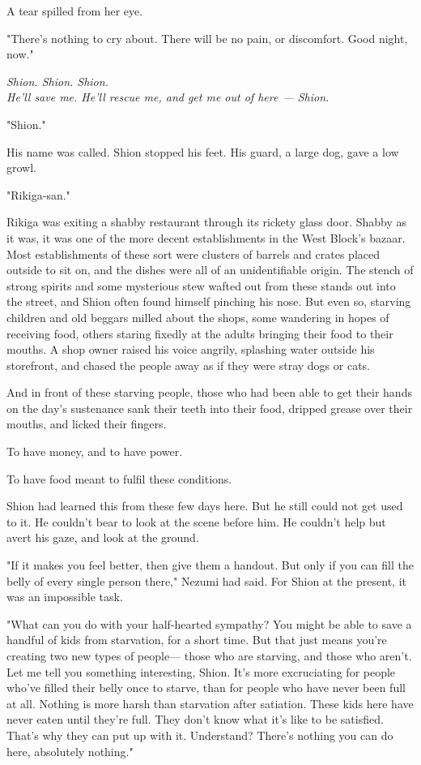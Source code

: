 A tear spilled from her eye.

"There's nothing to cry about. There will be no pain, or discomfort.
Good night, now."

\myspace

\emph{Shion. Shion. Shion.\\
	He'll save me. He'll rescue me, and get me out of here --- Shion.}

\myspace

"Shion."

His name was called. Shion stopped his feet. His guard, a large dog,
gave a low growl.

"Rikiga-san."

Rikiga was exiting a shabby restaurant through its rickety glass door.
Shabby as it was, it was one of the more decent establishments in the
West Block's bazaar. Most establishments of these sort were clusters of
barrels and crates placed outside to sit on, and the dishes were all of
an unidentifiable origin. The stench of strong spirits and some
mysterious stew wafted out from these stands out into the street, and
Shion often found himself pinching his nose. But even so, starving
children and old beggars milled about the shops, some wandering in hopes
of receiving food, others staring fixedly at the adults bringing their
food to their mouths. A shop owner raised his voice angrily, splashing
water outside his storefront, and chased the people away as if they were
stray dogs or cats.

And in front of these starving people, those who had been able to get
their hands on the day's sustenance sank their teeth into their food,
dripped grease over their mouths, and licked their fingers.

To have money, and to have power.

To have food meant to fulfil these conditions.

Shion had learned this from these few days here. But he still could not
get used to it. He couldn't bear to look at the scene before him. He
couldn't help but avert his gaze, and look at the ground.

"If it makes you feel better, then give them a handout. But only if you
can fill the belly of every single person there," Nezumi had said. For
Shion at the present, it was an impossible task.

"What can you do with your half-hearted sympathy? You might be able to
save a handful of kids from starvation, for a short time. But that just
means you're creating two new types of people--- those who are starving,
and those who aren't. Let me tell you something interesting, Shion. It's
more excruciating for people who've filled their belly once to starve,
than for people who have never been full at all. Nothing is more harsh
than starvation after satiation. These kids here have never eaten until
they're full. They don't know what it's like to be satisfied. That's why
they can put up with it. Understand? There's nothing you can do here,
absolutely nothing."


